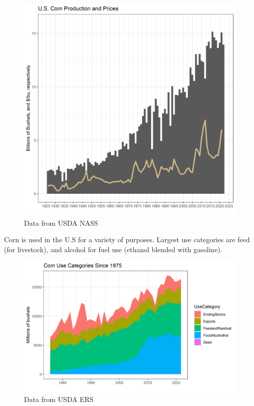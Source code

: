 \documentclass[
  letterpaper,
  DIV=11,
  numbers=noendperiod]{scrreprt}
\begin{document}
\begin{figure}

{\centering \includegraphics{assets/PrimerforGrain_CornProdand$.png}

}

\caption{Data from USDA NASS}

\end{figure}

Corn is used in the U.S for a variety of purposes. Largest use
categories are feed (for livestock), and alcohol for fuel use (ethanol
blended with gasoline).

\begin{figure}

{\centering \includegraphics{assets/PrimerforGrain_CornUse.png}

}

\caption{Data from USDA ERS}

\end{figure}
\end{document}
